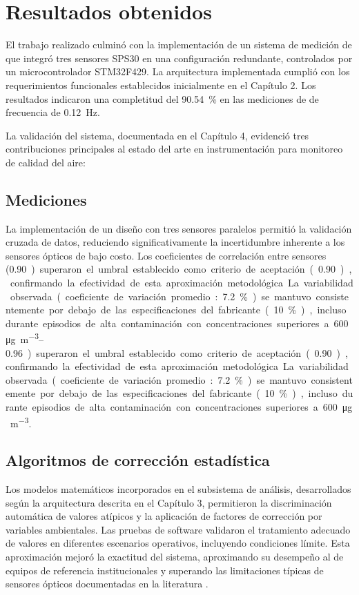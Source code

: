 \section{Resultados obtenidos}

El trabajo realizado culminó con la implementación de un sistema de medición de \MPF que integró  tres sensores SPS30 en una configuración redundante, controlados por un microcontrolador STM32F429. La arquitectura implementada cumplió con los requerimientos funcionales establecidos inicialmente en el Capítulo 2. Los resultados indicaron una completitud del \SI{90.54}{\percent} en las mediciones de \MPF de frecuencia de \SI{0.12}{\hertz}.

La validación del sistema, documentada en el Capítulo 4, evidenció tres contribuciones principales al estado del arte en instrumentación para monitoreo de calidad del aire:

\subsection*{Mediciones}
	La implementación de un diseño con tres sensores paralelos permitió la validación cruzada de datos, reduciendo significativamente la incertidumbre inherente a los sensores ópticos de bajo costo. Los coeficientes de correlación entre sensores (\SIrange{0.90}{0.96}) superaron el umbral establecido como criterio de aceptación (\SI{0.90}{}), confirmando la efectividad de esta aproximación metodológica. La variabilidad observada (coeficiente de variación promedio: \SI{7.2}{\percent}) se mantuvo consistentemente por debajo de las especificaciones del fabricante (\SI{10}{\percent}), incluso durante episodios de alta contaminación con concentraciones superiores a \SI{600}{\micro\gram\per\cubic\meter}.
	
\subsection*{Algoritmos de corrección estadística}
	Los modelos matemáticos incorporados en el subsistema de análisis, desarrollados según la arquitectura descrita en el Capítulo 3, permitieron la discriminación automática de valores atípicos y la aplicación de factores de corrección por variables ambientales. Las pruebas de software validaron el tratamiento adecuado de valores en diferentes escenarios operativos, incluyendo condiciones límite. Esta aproximación mejoró la exactitud del sistema, aproximando su desempeño al de equipos de referencia institucionales y superando las limitaciones típicas de sensores ópticos documentadas en la literatura \citep{Kuula2020}.
	
